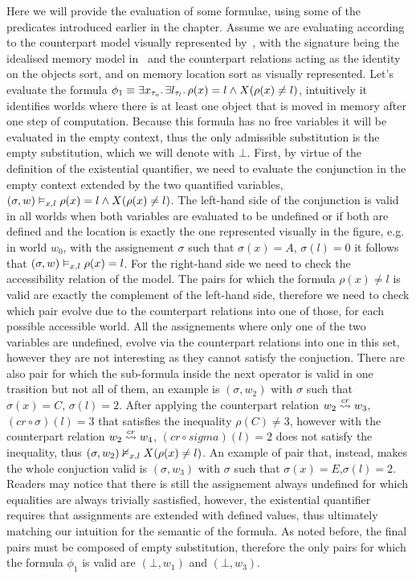 Here we will provide the evaluation of some formulae, using some of the predicates introduced earlier in the chapter.
Assume we are evaluating according to the counterpart model visually represented by~, with
the signature being the idealised memory model in~ and the counterpart relations acting as the
identity on the objects sort, and on memory location sort as visually represented.
Let's evaluate the formula $\phi_1 \equiv \exists {x_{\tau_o}} \ldotp {\exists {l_{\tau_l}} \ldotp {\rho(x) = l \land X{(\rho(x)
\neq l)}}}$, intuitively it identifies worlds where there is at least one object that is moved in memory after one step
of computation. Because this formula has no free variables it will be evaluated in the empty context, thus the only
admissible substitution is the empty substitution, which we will denote with $\bot$.
First, by virtue of the definition of the existential quantifier, we need to evaluate the conjunction in the empty
context extended by the two quantified variables, $({\sigma}, {w}) \vDash_{x,l} {\rho(x) = l \land X{(\rho(x) \neq l)}}$.
The left-hand side of the conjunction is valid in all worlds when both variables are evaluated to be undefined or if
both are defined and the location is exactly the one represented visually in the figure, e.g. in world $w_0$, with
the assignement $\sigma$ such that $\sigma(x) = A$, $\sigma(l) = 0$ it follows that $({\sigma}, {w}) \vDash_{x,l} {\rho(x) = l}$.
For the right-hand side we need to check the accessibility relation of the model. The pairs for which the formula
$\rho(x) \neq l$ is valid are exactly the complement of the left-hand side, therefore we need to check which pair evolve
due to the counterpart relations into one of those, for each possible accessible world. All the assignements where only
one of the two variables are undefined, evolve via the counterpart relations into one in this set, however they are not
interesting as they cannot satisfy the conjuction. There are also pair for which the sub-formula inside the next
operator is valid in one trasition but not all of them, an example is $(\sigma, w_2)$ with $\sigma$ such that $\sigma(x) = C$,
$\sigma(l) = 2$. After applying the counterpart relation $w_2 \overset{cr}{\rightsquigarrow} w_3$, $(cr \circ \sigma)(l) = 3$ that
satisfies the inequality $\rho(C) \neq 3$, however with the counterpart relation $w_2 \overset{cr}{\rightsquigarrow} w_4$,
$(cr \circ sigma)(l) = 2$ does not satisfy the inequality, thus $({\sigma}, {w_2}) \nvDash_{x,l} {X{(\rho(x) \neq l)}}$.
An example of pair that, instead, makes the whole conjuction valid is $(\sigma, w_3)$ with $\sigma$ such that $\sigma(x)
= E$,$\sigma(l) = 2$. Readers may notice that there is still the assignement always undefined for which equalities are
always trivially sastisfied, however, the existential quantifier requires that assignments are extended with defined
values, thus ultimately matching our intuition for the semantic of the formula. As noted before, the final pairs must be
composed of empty substitution, therefore the only pairs for which the formula $\phi_1$ is valid are $(\bot, w_1)$ and
$(\bot, w_3)$.

